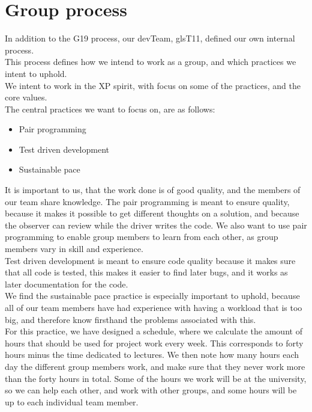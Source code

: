\section{Group process}

In addition to the \gls{G19} process, our \gls{devTeam}, gls{T11}, defined our own internal process.\\
This process defines how we intend to work as a group, and which practices we intent to uphold. \\

We intent to work in the \gls{XP} spirit, with focus on some of the practices, and the core values.\\
The central practices we want to focus on, are as follows:
\begin{itemize}
    \item Pair programming 
    \item Test driven development
    \item Sustainable pace
\end{itemize}

It is important to us, that the work done is of good quality, and the members of our team share knowledge. The pair programming is meant to ensure quality, because it makes it possible to get different thoughts on a solution, and because the observer can review while the \gls{driver} writes the code. We also want to use pair programming to enable group members to learn from each other, as group members vary in skill and experience.\\
Test driven development is meant to ensure code quality because it makes sure that all code is tested, this makes it easier to find later bugs, and it works as later documentation for the code.\\
We find the sustainable pace practice is especially important to uphold, because all of our team members have had experience with having a workload that is too big, and therefore know firsthand the problems associated with this.\\
For this practice, we have designed a schedule, where we calculate the amount of hours that should be used for project work every week. This corresponds to forty hours minus the time dedicated to lectures. We then note how many hours each day the different group members work, and make sure that they never work more than the forty hours in total. Some of the hours we work will be at the university, so we can help each other, and work with other groups, and some hours will be up to each individual team member.\\

